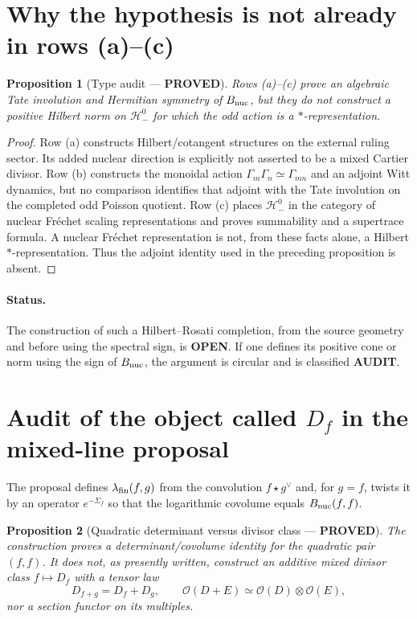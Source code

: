 \documentclass[11pt]{article}
\newcommand{\PROVED}{\textcolor{green!40!black}{\textbf{PROVED}}}
\newcommand{\OPEN}{\textcolor{red!70!black}{\textbf{OPEN}}}
\newcommand{\AUDIT}{\textcolor{orange!70!black}{\textbf{AUDIT}}}
\newtheorem{proposition}{Proposition}
\begin{document}
\section{Why the hypothesis is not already in rows (a)--(c)}

\begin{proposition}[Type audit --- \PROVED]
Rows (a)--(c) prove an algebraic Tate involution and Hermitian symmetry of
$B_{\rm nuc}$, but they do not construct a positive Hilbert norm on
$\mathcal H_-^0$ for which the odd action is a $*$-representation.
\end{proposition}

\begin{proof}
Row (a) constructs Hilbert/cotangent structures on the external ruling
sector.  Its added nuclear direction is explicitly not asserted to be a
mixed Cartier divisor.  Row (b) constructs the monoidal action
$\Gamma_m\Gamma_n\simeq\Gamma_{mn}$ and an adjoint Witt dynamics, but no
comparison identifies that adjoint with the Tate involution on the completed
odd Poisson quotient.  Row (c) places $\mathcal H_-^0$ in the category of
nuclear Fr\'echet scaling representations and proves summability and a
supertrace formula.  A nuclear Fr\'echet representation is not, from these
facts alone, a Hilbert $*$-representation.  Thus the adjoint identity used in
the preceding proposition is absent.
\end{proof}

\paragraph{Status.} The construction of such a Hilbert--Rosati completion,
from the source geometry and before using the spectral sign, is \OPEN.  If
one defines its positive cone or norm using the sign of $B_{\rm nuc}$, the
argument is circular and is classified \AUDIT.

\section{Audit of the object called $D_f$ in the mixed-line proposal}

The proposal defines $\lambda_{\rm fin}(f,g)$ from the convolution
$f\star g^\vee$ and, for $g=f$, twists it by an operator $e^{-\Sigma_f}$ so
that the logarithmic covolume equals $B_{\rm nuc}(f,f)$.

\begin{proposition}[Quadratic determinant versus divisor class --- \PROVED]
The construction proves a determinant/covolume identity for the quadratic
pair $(f,f)$.  It does not, as presently written, construct an additive mixed
divisor class $f\mapsto D_f$ with a tensor law
\[
 D_{f+g}=D_f+D_g,
 \qquad \mathcal O(D+E)\simeq\mathcal O(D)\otimes\mathcal O(E),
\]
nor a section functor on its multiples.
\end{proposition}
\end{document}
